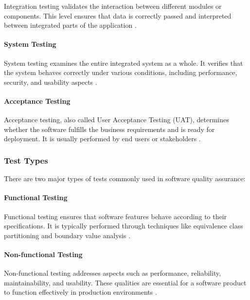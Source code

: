 Integration testing validates the interaction between different modules or components. This level ensures that data is correctly passed and interpreted between integrated parts of the application \cite{burnstein2003practical}.

\paragraph{System Testing}

System testing examines the entire integrated system as a whole. It verifies that the system behaves correctly under various conditions, including performance, security, and usability aspects \cite{myers2011art}.

\paragraph{Acceptance Testing}

Acceptance testing, also called User Acceptance Testing (UAT), determines whether the software fulfills the business requirements and is ready for deployment. It is usually performed by end users or stakeholders \cite{kaner1999testing}.

\subsubsection{Test Types}

There are two major types of tests commonly used in software quality assurance:

\paragraph{Functional Testing}

Functional testing ensures that software features behave according to their specifications. It is typically performed through techniques like equivalence class partitioning and boundary value analysis \cite{pressman2014software}.

\paragraph{Non-functional Testing}

Non-functional testing addresses aspects such as performance, reliability, maintainability, and usability. These qualities are essential for a software product to function effectively in production environments \cite{kaner1999testing}.


